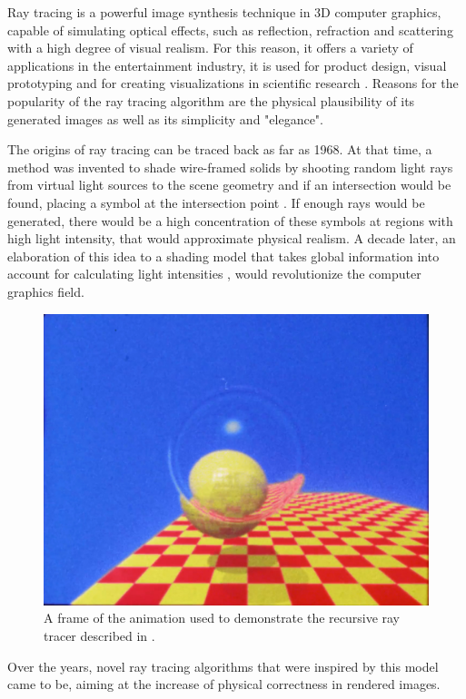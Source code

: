 \label{chap:intro}

Ray tracing is a powerful image synthesis technique in 3D computer graphics, capable of simulating optical effects, such as reflection, refraction and scattering with a high degree of visual realism. For this reason, it offers a variety of applications in the entertainment industry, it is used for product design, visual prototyping and for creating visualizations in scientific research \cite[pp 91-128]{peddie2019ray}. Reasons for the popularity of the ray tracing algorithm are the physical plausibility of its generated images as well as its simplicity and "elegance". 

The origins of ray tracing can be traced back as far as 1968. At that time, a method was invented to shade wire-framed solids by shooting random light rays from virtual light sources to the scene geometry and if an intersection would be found, placing a symbol at the intersection point \cite{appel1968some}. If enough rays would be generated, there would be a high concentration of these symbols at regions with high light intensity, that would approximate physical realism. 
A decade later, an elaboration of this idea to a shading model that takes global information into account for calculating light intensities \cite{whitted1979improved}, would revolutionize the computer graphics field.

\begin{figure}
	\centering
	\includegraphics[width=.7\linewidth]{img/0 introduction/whitted_}
	\caption{A frame of the animation used to demonstrate the recursive ray tracer described in \cite{whitted1979improved}.\cite{raytracingvideo}}
	\label{fig:g}
\end{figure}

Over the years, novel ray tracing algorithms that were inspired by this model came to be, aiming at the increase of physical correctness in rendered images. 

